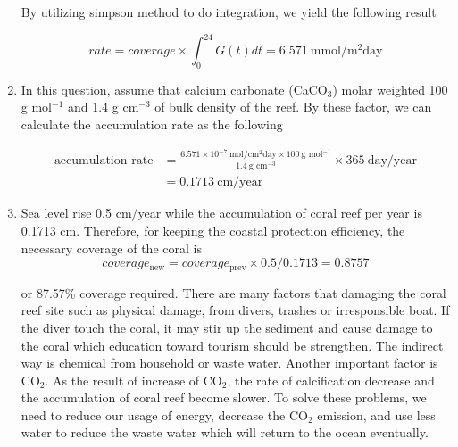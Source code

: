 \documentclass[a4paper]{report}
\begin{document}
\begin{enumerate}
By utilizing simpson method to do integration, we yield the following result

\begin{equation}
    rate = coverage \times \int^{24}_{0} G(t) dt = 6.571 \ \text{mmol}/\text{m}^2\text{day}
\end{equation}

\item
In this question, assume that calcium carbonate (CaCO$_3$) molar weighted 100 g mol$^{-1}$ and 1.4 g cm$^{-3}$ of bulk density of the reef. By these factor, we can calculate the accumulation rate as the following

\begin{align*}
    \text{accumulation rate} &= \frac{6.571\times10^{-7}\ \text{mol}/\text{cm}^2\text{day}\times100\ \text{g mol}^{-1}}{1.4\ \text{g cm}^{-3}}\times365\ \text{day/year}\\
    &= 0.1713 \ \text{cm/year}
\end{align*}

\item Sea level rise 0.5 cm/year while the accumulation of coral reef per year is 0.1713 cm. Therefore, for keeping the coastal protection efficiency, the necessary coverage of the coral is
\[coverage_{\text{new}} = coverage_{\text{prev}}\times0.5 / 0.1713=0.8757\]

or 87.57\% coverage required. 
There are many factors that damaging the coral reef site such as physical damage, from divers, trashes or irresponsible boat. If the diver touch the coral, it may stir up the sediment and cause damage to the coral which education toward tourism should be strengthen. The indirect way is chemical from household or waste water. Another important factor is CO$_2$. As the result of increase of CO$_2$, the rate of calcification decrease and the accumulation of coral reef become slower. To solve these problems, we need to reduce our usage of energy, decrease the CO$_2$ emission, and use less water to reduce the waste water which will return to the ocean eventually.

\end{enumerate}
\end{document}

